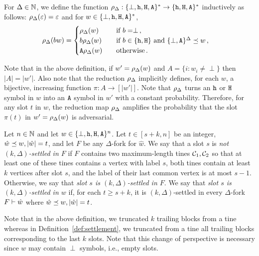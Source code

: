   \begin{definition}\label{def:reduction-map}
    For $\Delta \in \mathbb{N}$, 
    we define the function $\rho_\Delta : \{\perp, \mathtt{h}, \mathtt{H}, \mathtt{A}\}^* \rightarrow \{\mathtt{h}, \mathtt{H}, \mathtt{A}\}^*$ 
    inductively as follows: $\rho_\Delta(\varepsilon) = \varepsilon$ and 
    for $w \in \{\perp, \mathtt{h}, \mathtt{H}, \mathtt{A}\}^*$, 
    \begin{align}
      \rho_\Delta(b w) &= 
      \begin{cases}
        \rho_\Delta(w) & \quad\text{if $b = \perp$}\,, \\
        b \rho_\Delta(w) & \quad\text{if $b \in \{\mathtt{h}, \mathtt{H}\}$ and $\{\perp, \mathtt{A}\}^{\Delta} \preceq w$}\,, \\
        \mathtt{A} \rho_\Delta(w) & \quad\text{otherwise}
        \,.
      \end{cases}
    \end{align}    
  \end{definition}
  \noindent
  Note that in the above definition, 
  if $w' = \rho_\Delta(w)$ and 
  $A = \{i : w_i \neq \perp\}$ then $|A| = |w'|$. 
  Also note that 
  the reduction $\rho_\Delta$ implicitly defines, for each $w$, 
  a 
  bijective, increasing function $\pi : A \rightarrow [|w'|]$. 
  Note that 
  $\rho_\Delta$ turns an $\mathtt{h}$ or $\mathtt{H}$ symbol in $w$ 
  into an $\mathtt{A}$ symbol in $w'$ with a constant probability. 
  Therefore, for any slot $t$ in $w$, 
  the reduction map $\rho_\Delta$ 
  amplifies the probability that the slot $\pi(t)$ 
  in $w' = \rho_\Delta(w)$ is adversarial. 



  \begin{definition}\label{def:settlement-delta}
    Let $n \in \mathbb{N}$ and let $w \in \{\perp, \mathtt{h}, \mathtt{H}, \mathtt{A}\}^n$. 
    Let $t \in [s + k, n]$ be an integer, $\hat{w} \preceq w, |\hat{w}| = t$, and 
    let $F$ be any $\Delta$-fork for $\hat{w}$. 
    We say that a slot $s$ is \emph{not $(k, \Delta)$-settled in $F$} 
    if $F$ contains 
    two maximum-length tines $\mathcal{C}_1, \mathcal{C}_2$ so that 
    at least one of these tines contains a vertex with label $s$,
    both tines contain at least $k$ vertices after slot $s$, and 
    the label of their last common vertex is at most $s - 1$. 
    Otherwise, we say that \emph{slot $s$ is $(k, \Delta)$-settled in $F$}. 
    We say that \emph{slot $s$ is $(k, \Delta)$-settled in $w$} if, 
    for each $t \geq s+k$, 
    it is $(k, \Delta)$-settled in every $\Delta$-fork $F \vdash \hat{w}$ 
    where $\hat{w} \preceq w, |\hat{w}| = t$.
  \end{definition}
  Note that in the above definition, 
  we truncated $k$ trailing blocks from a tine 
  whereas in Definition~\ref{def:settlement}, 
  we truncated from a tine 
  all trailing blocks corresponding to the last $k$ slots. 
  Note that this change of perspective is necessary since 
  $w$ may contain $\perp$ symbols, i.e., empty slots.




